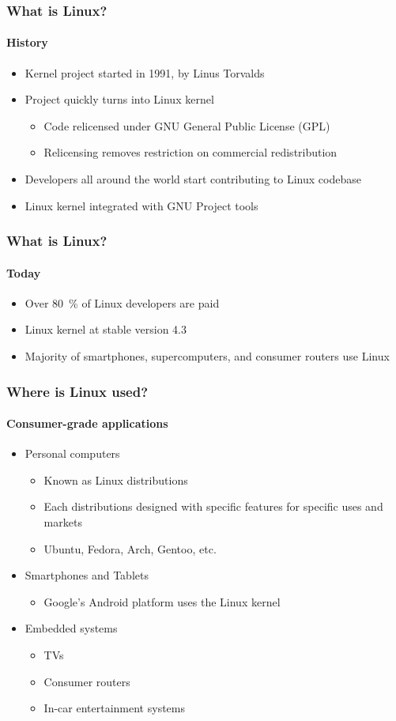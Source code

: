\documentclass{beamer}
\begin{document}
\begin{frame}
  \frametitle{What is Linux?}
  \framesubtitle{History}
  \begin{itemize}
  \item Kernel project started in 1991, by Linus Torvalds
  \item Project quickly turns into Linux kernel
    \begin{itemize}
    \item Code relicensed under GNU General Public License (GPL)
    \item Relicensing removes restriction on commercial redistribution
    \end{itemize}
  \item Developers all around the world start contributing to Linux codebase
  \item Linux kernel integrated with GNU Project tools
  \end{itemize}
\end{frame}

\begin{frame}
\frametitle{What is Linux?}
\framesubtitle{Today}
  \begin{itemize}
  \item Over \SI{80}{\percent} of Linux developers are paid
  \item Linux kernel at stable version 4.3
  \item Majority of smartphones, supercomputers, and consumer routers use Linux
  \end{itemize}
\end{frame}

\begin{frame}
  \frametitle{Where is Linux used?}
  \framesubtitle{Consumer-grade applications}
  \begin{itemize}
  \item Personal computers \begin{itemize}
    \item Known as Linux distributions
    \item Each distributions designed with specific features for specific uses and markets
    \item Ubuntu, Fedora, Arch, Gentoo, etc.
    \end{itemize} \pause
  \item Smartphones and Tablets \begin{itemize}
    \item Google's Android platform uses the Linux kernel
    \end{itemize} \pause
  \item Embedded systems \begin{itemize}
    \item TVs
    \item Consumer routers
    \item In-car entertainment systems
    \end{itemize}
  \end{itemize}
\end{frame}
\end{document}

